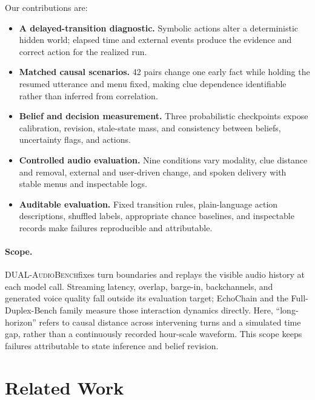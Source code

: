 \documentclass{article}
\newcommand{\benchmark}{\textsc{DUAL-AudioBench}}
\newcommand{\numpairs}{42}
\begin{document}
Our contributions are:
\begin{itemize}
  \item \textbf{A delayed-transition diagnostic.} Symbolic actions alter a deterministic hidden world; elapsed time and external events produce the evidence and correct action for the realized run.
  \item \textbf{Matched causal scenarios.} \numpairs{} pairs change one early fact while holding the resumed utterance and menu fixed, making clue dependence identifiable rather than inferred from correlation.
  \item \textbf{Belief and decision measurement.} Three probabilistic checkpoints expose calibration, revision, stale-state mass, and consistency between beliefs, uncertainty flags, and actions.
  \item \textbf{Controlled audio evaluation.} Nine conditions vary modality, clue distance and removal, external and user-driven change, and spoken delivery with stable menus and inspectable logs.
  \item \textbf{Auditable evaluation.} Fixed transition rules, plain-language action descriptions, shuffled labels, appropriate chance baselines, and inspectable records make failures reproducible and attributable.
\end{itemize}

\paragraph{Scope.}
\benchmark fixes turn boundaries and replays the visible audio history at each model call. Streaming latency, overlap, barge-in, backchannels, and generated voice quality fall outside its evaluation target; EchoChain and the Full-Duplex-Bench family measure those interaction dynamics directly. Here, ``long-horizon'' refers to causal distance across intervening turns and a simulated time gap, rather than a continuously recorded hour-scale waveform. This scope keeps failures attributable to state inference and belief revision.

\section{Related Work}
\end{document}
